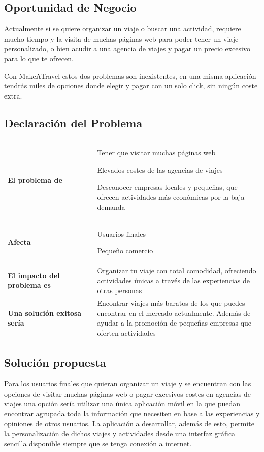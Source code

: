\documentclass[11pt]{article}
\begin{document}
\subsection{Oportunidad de Negocio}
Actualmente si se quiere organizar un viaje o buscar una actividad,  requiere mucho tiempo y la visita de muchas páginas web para poder tener un viaje personalizado, o bien acudir a una agencia de viajes y pagar un precio excesivo para lo que te ofrecen.

Con MakeATravel estos dos problemas son inexistentes, en una misma aplicación tendrás miles de opciones donde elegir y pagar con un solo click, sin ningún coste extra.

\subsection{Declaración del Problema}

\begin{table}[H]
  \centering
  \begin{tabular}{p{0.35\linewidth}|p{0.65\linewidth}}
    \toprule
    \textbf{El problema de} & Tener que visitar muchas páginas web
    
    Elevados costes de las agencias de viajes
    
    Desconocer empresas locales y pequeñas, que ofrecen actividades más económicas por la baja demanda\\
    \textbf{Afecta} & Usuarios finales 
    
    Pequeño comercio\\
    \textbf{El impacto del problema es} & Organizar tu viaje con total comodidad, ofreciendo actividades únicas a través de las experiencias de otras personas\\
    \textbf{Una solución exitosa sería} & Encontrar viajes más baratos de los que puedes encontrar en el mercado actualmente. Además de ayudar a la promoción de pequeñas empresas que oferten actividades\\
    \bottomrule
  \end{tabular}
\end{table}

\subsection{Solución propuesta}
Para los usuarios finales que quieran organizar un viaje y se encuentran con las opciones de visitar muchas páginas web o pagar excesivos costes en agencias de viajes una opción sería utilizar una única aplicación móvil en la que puedan encontrar agrupada toda la información que necesiten en base a las experiencias y opiniones de otros usuarios. La aplicación a desarrollar, además de esto, permite la personalización de dichos viajes y actividades desde una interfaz gráfica sencilla disponible siempre que se tenga conexión a internet.
\end{document}
